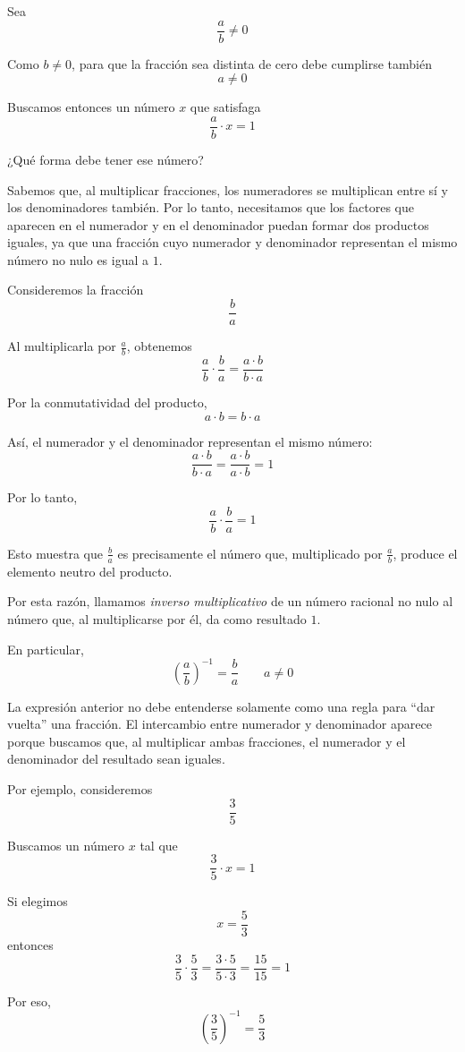 Sea
\[
\frac{a}{b}\ne0
\]

Como \(b\ne0\), para que la fracción sea distinta de cero debe cumplirse también
\[
a\ne0
\]

Buscamos entonces un número \(x\) que satisfaga
\[
\frac{a}{b}\cdot x=1
\]

¿Qué forma debe tener ese número?

Sabemos que, al multiplicar fracciones, los numeradores se multiplican entre sí y los denominadores también. Por lo tanto, necesitamos que los factores que aparecen en el numerador y en el denominador puedan formar dos productos iguales, ya que una fracción cuyo numerador y denominador representan el mismo número no nulo es igual a \(1\).

Consideremos la fracción
\[
\frac{b}{a}
\]

Al multiplicarla por \(\frac{a}{b}\), obtenemos
\[
\frac{a}{b}\cdot\frac{b}{a}
=
\frac{a\cdot b}{b\cdot a}
\]

Por la conmutatividad del producto,
\[
a\cdot b=b\cdot a
\]

Así, el numerador y el denominador representan el mismo número:
\[
\frac{a\cdot b}{b\cdot a}
=
\frac{a\cdot b}{a\cdot b}
=
1
\]

Por lo tanto,
\[
\frac{a}{b}\cdot\frac{b}{a}=1
\]

Esto muestra que \(\frac{b}{a}\) es precisamente el número que, multiplicado por \(\frac{a}{b}\), produce el elemento neutro del producto.

Por esta razón, llamamos \emph{inverso multiplicativo} de un número racional no nulo al número que, al multiplicarse por él, da como resultado \(1\).

En particular,
\[
\boxed{
\left(\frac{a}{b}\right)^{-1}
=
\frac{b}{a}
}
\qquad
a\ne0
\]

La expresión anterior no debe entenderse solamente como una regla para ``dar vuelta'' una fracción. El intercambio entre numerador y denominador aparece porque buscamos que, al multiplicar ambas fracciones, el numerador y el denominador del resultado sean iguales.

Por ejemplo, consideremos
\[
\frac{3}{5}
\]

Buscamos un número \(x\) tal que
\[
\frac{3}{5}\cdot x=1
\]

Si elegimos
\[
x=\frac{5}{3}
\]
entonces
\[
\frac{3}{5}\cdot\frac{5}{3}
=
\frac{3\cdot5}{5\cdot3}
=
\frac{15}{15}
=
1
\]

Por eso,
\[
\left(\frac35\right)^{-1}
=
\frac53
\]

